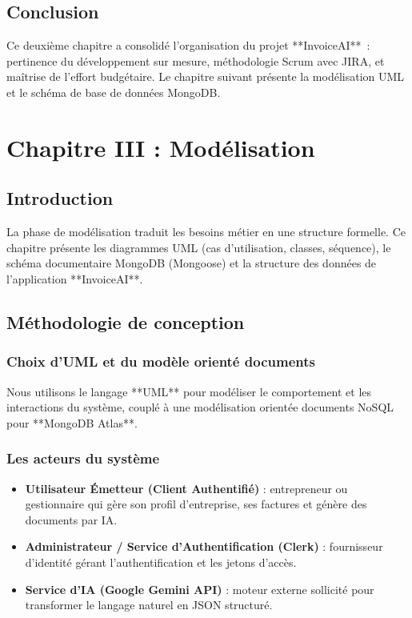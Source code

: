 \documentclass[a4paper,12pt]{extarticle}
\begin{document}
\subsection*{Conclusion}

Ce deuxième chapitre a consolidé l'organisation du projet **InvoiceAI**~: pertinence du développement sur mesure, méthodologie Scrum avec JIRA, et maîtrise de l'effort budgétaire. Le chapitre suivant présente la modélisation UML et le schéma de base de données MongoDB.

\newpage
\section{Chapitre III : Modélisation}

\subsection*{Introduction}
{}

La phase de modélisation traduit les besoins métier en une structure formelle. Ce chapitre présente les diagrammes UML (cas d'utilisation, classes, séquence), le schéma documentaire MongoDB (Mongoose) et la structure des données de l'application **InvoiceAI**.

\subsection{Méthodologie de conception}

\subsubsection{Choix d'UML et du modèle orienté documents}

Nous utilisons le langage **UML** pour modéliser le comportement et les interactions du système, couplé à une modélisation orientée documents NoSQL pour **MongoDB Atlas**.

\subsubsection{Les acteurs du système}

\begin{itemize}
  \item \textbf{Utilisateur Émetteur (Client Authentifié)} : entrepreneur ou gestionnaire qui gère son profil d'entreprise, ses factures et génère des documents par IA.
  \item \textbf{Administrateur / Service d'Authentification (Clerk)} : fournisseur d'identité gérant l'authentification et les jetons d'accès.
  \item \textbf{Service d'IA (Google Gemini API)} : moteur externe sollicité pour transformer le langage naturel en JSON structuré.
\end{itemize}
\end{document}
